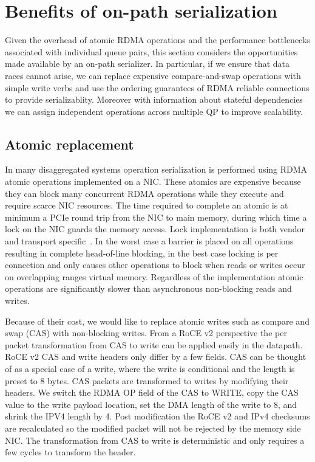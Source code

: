 \section{Benefits of on-path serialization}

Given the overhead of atomic RDMA operations and the performance bottlenecks
associated with individual queue pairs, this section considers the opportunities
made available by an on-path serializer.  In particular, if we ensure that data
races cannot arise, we can replace expensive compare-and-swap operations with
simple write verbs and use the ordering guarantees of RDMA reliable connections
to provide serializablity. Moreover with information about stateful dependencies
we can assign independent operations across multiple QP to improve scalability.

\subsection{Atomic replacement} 

In many disaggregated systems operation serialization is performed using RDMA
atomic operations implemented on a NIC. These atomics are expensive because they
can block many concurrent RDMA operations while they execute and require scarce
NIC resources. The time required to complete an atomic is at minimum a PCIe
round trip from the NIC to main memory, during which time a lock on the NIC
guards the memory access. Lock implementation is both vendor and transport
specific~\cite{design-guidelines}. In the worst case a barrier is placed on all
operations resulting in complete head-of-line blocking, in the best case locking
is per connection and only causes other operations to block when reads or writes
occur on overlapping ranges virtual memory. Regardless of the implementation
atomic operations are significantly slower than asynchronous non-blocking reads
and writes.

Because of their cost, we would like to replace atomic writes such as compare
and swap (CAS) with non-blocking writes.  From a RoCE v2 perspective the per
packet transformation from CAS to write can be applied easily in the datapath.
RoCE v2 CAS and write headers only differ by a few fields. CAS can be thought of
as a special case of a write, where the write is conditional and the length is
preset to 8 bytes.
CAS packets are transformed to writes by modifying their headers. We switch the
RDMA OP field of the CAS to WRITE, copy the CAS value to the write payload
location, set the DMA length of the write to 8, and shrink the IPV4 length by 4.
Post modification the RoCE v2 and IPv4 checksums are recalculated so the
modified packet will not be rejected by the memory side NIC. The transformation
from CAS to write is deterministic and only requires a few cycles to transform
the header.

